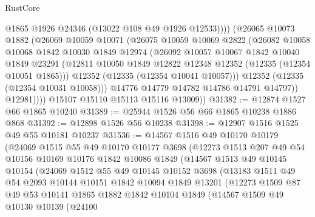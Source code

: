 \begin{lexlean}{RustCore}
\begin{coremodule}
                    @1865
                    @1926
                    @24346
                    (@13022 @108 @49 @1926 @12533))))
              (@26065
                @10073
                @1882
                (@26069
                  @10059
                  @10071
                  (@26075
                    @10059
                    @10069
                    @2822
                    (@26082
                      @10058
                      @10068
                      @1842
                      @10030
                      @1849
                      @12974
                      (@26092
                        @10057
                        @10067
                        @1842
                        @10040
                        @1849
                        @23291
                        (@12811 @10050 @1849 @12822 @12348 @12352 (@12335 (@12354 @10051 @1865)))
                        @12352
                        (@12335 (@12354 @10041 @10057)))
                      @12352
                      (@12335 (@12354 @10031 @10058)))
                    @14776
                    @14779
                    @14782
                    @14786
                    @14791
                    @14797))
                @12981))))
        @15107
        @15110
        @15113
        @15116
        @13009))
@31382 := @12874 @1527 @66 @1865 @10240
@31389 := @25944 @1526 @56 @66 @1865 @10238 @1886 @868
@31392 := @12898 @1526 @56 @10238
@31398 := @12907 @1516 @1525 @49 @55 @10181 @10237
@31536 := @14567
    @1516
    @49
    @10170
    @10179
    (@24069
      @1515
      @55
      @49
      @10170
      @10177
      @3698
      (@12273
        @1513
        @207
        @49
        @54
        @10156
        @10169
        @10176
        @1842
        @10086
        @1849
        (@14567
          @1513
          @49
          @10145
          @10154
          (@24069
            @1512
            @55
            @49
            @10145
            @10152
            @3698
            (@13183
              @1511
              @49
              @54
              @2093
              @10144
              @10151
              @1842
              @10094
              @1849
              @13201
              (@12273
                @1509
                @87
                @49
                @53
                @10141
                @1865
                @1882
                @1842
                @10104
                @1849
                (@14567
                  @1509
                  @49
                  @10130
                  @10139
                  (@24100

\end{coremodule}
\end{lexlean}
